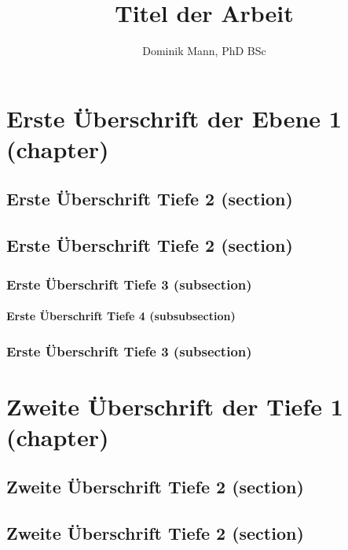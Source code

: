 \documentclass[Master,english,IEEE]{twbook}
\title{Titel der Arbeit}
\author{Dominik Mann, PhD BSc}
\begin{document}
\maketitle

%
%
\chapter{Erste Überschrift der Ebene 1 (chapter)}
\blindmathpaper

\section{Erste Überschrift Tiefe 2 (section)}
\blindtext

\section{Erste Überschrift Tiefe 2 (section)}
\blindtext

\subsection{Erste Überschrift Tiefe 3 (subsection)}
\blindtext

\subsubsection{Erste Überschrift Tiefe 4 (subsubsection)}
\blindtext

\subsection{Erste Überschrift Tiefe 3 (subsection)}
\blindtext

\chapter{Zweite Überschrift der Tiefe 1 (chapter)}
\blindtext

\section{Zweite Überschrift Tiefe 2 (section)}
\blindtext

\section{Zweite Überschrift Tiefe 2 (section)}
\blindtext
\end{document}
